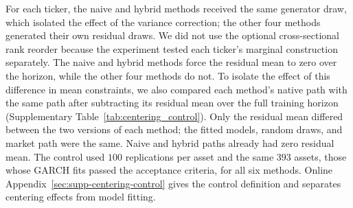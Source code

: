 For each ticker, the naive and hybrid methods received the same
generator draw, which isolated the effect of the variance correction;
the other four methods generated their own residual draws. We did not
use the optional cross-sectional rank reorder because the experiment
tested each ticker's marginal construction separately. The naive and
hybrid methods force the residual mean to zero over the horizon,
while the other four methods do not. To isolate the effect of this
difference in mean constraints, we also compared each method's native
path with the same path after subtracting its residual mean over the
full training horizon (Supplementary Table~\ref{tab:centering_control}). Only the residual mean differed between the two versions of each
method; the fitted models, random draws, and market path were the
same. Naive and hybrid
paths already had zero residual mean. The control used $100$
replications per asset and the same $393$ assets, those whose GARCH fits passed the acceptance
criteria, for all six methods. Online
Appendix~\ref{sec:supp-centering-control} gives the control definition
and separates centering effects from model fitting.

